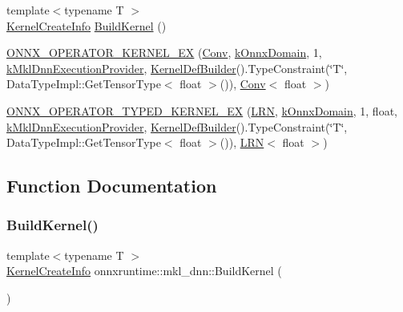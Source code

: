 \begin{DoxyCompactItemize}
\item 
{\footnotesize template$<$typename T $>$ }\\\mbox{\hyperlink{structonnxruntime_1_1KernelCreateInfo}{Kernel\+Create\+Info}} \mbox{\hyperlink{namespaceonnxruntime_1_1mkl__dnn_a66369c77f12297537841c9aadca7d427}{Build\+Kernel}} ()
\item 
\mbox{\hyperlink{namespaceonnxruntime_1_1mkl__dnn_abd45030b5efae8ef6afeadd4a639a123}{O\+N\+N\+X\+\_\+\+O\+P\+E\+R\+A\+T\+O\+R\+\_\+\+K\+E\+R\+N\+E\+L\+\_\+\+EX}} (\mbox{\hyperlink{classonnxruntime_1_1mkl__dnn_1_1Conv}{Conv}}, \mbox{\hyperlink{namespaceonnxruntime_ac0e7c0c106a2c9e9594560a3ab289fa0}{k\+Onnx\+Domain}}, 1, \mbox{\hyperlink{namespaceonnxruntime_abd1901c951bcb5845eeeaff9dd75ce97}{k\+Mkl\+Dnn\+Execution\+Provider}}, \mbox{\hyperlink{classonnxruntime_1_1KernelDefBuilder}{Kernel\+Def\+Builder}}().Type\+Constraint(\char`\"{}T\char`\"{}, Data\+Type\+Impl\+::\+Get\+Tensor\+Type$<$ float $>$()), \mbox{\hyperlink{classonnxruntime_1_1mkl__dnn_1_1Conv}{Conv}}$<$ float $>$)
\item 
\mbox{\hyperlink{namespaceonnxruntime_1_1mkl__dnn_a2bac6d02830a8898f4f7d0e40b5710f3}{O\+N\+N\+X\+\_\+\+O\+P\+E\+R\+A\+T\+O\+R\+\_\+\+T\+Y\+P\+E\+D\+\_\+\+K\+E\+R\+N\+E\+L\+\_\+\+EX}} (\mbox{\hyperlink{classonnxruntime_1_1mkl__dnn_1_1LRN}{L\+RN}}, \mbox{\hyperlink{namespaceonnxruntime_ac0e7c0c106a2c9e9594560a3ab289fa0}{k\+Onnx\+Domain}}, 1, float, \mbox{\hyperlink{namespaceonnxruntime_abd1901c951bcb5845eeeaff9dd75ce97}{k\+Mkl\+Dnn\+Execution\+Provider}}, \mbox{\hyperlink{classonnxruntime_1_1KernelDefBuilder}{Kernel\+Def\+Builder}}().Type\+Constraint(\char`\"{}T\char`\"{}, Data\+Type\+Impl\+::\+Get\+Tensor\+Type$<$ float $>$()), \mbox{\hyperlink{classonnxruntime_1_1mkl__dnn_1_1LRN}{L\+RN}}$<$ float $>$)
\end{DoxyCompactItemize}


\subsection{Function Documentation}
\mbox{\label{namespaceonnxruntime_1_1mkl__dnn_a66369c77f12297537841c9aadca7d427}} 
\subsubsection{\texorpdfstring{Build\+Kernel()}{BuildKernel()}}
{\footnotesize\ttfamily template$<$typename T $>$ \\
\mbox{\hyperlink{structonnxruntime_1_1KernelCreateInfo}{Kernel\+Create\+Info}} onnxruntime\+::mkl\+\_\+dnn\+::\+Build\+Kernel (\begin{DoxyParamCaption}{ }\end{DoxyParamCaption})}

